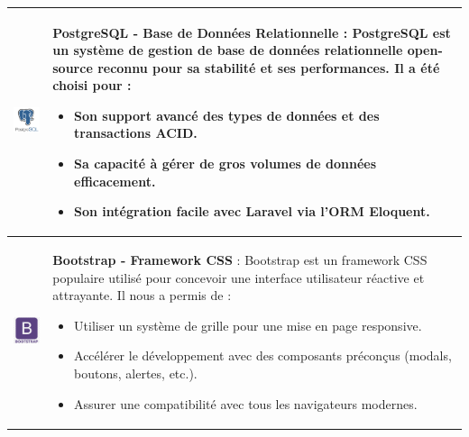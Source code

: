 \begin{longtable}{|m{4cm}|m{10cm}|}
    \includegraphics[width=3cm]{images/logo/postgresql.png} & 
    \textbf{PostgreSQL - Base de Données Relationnelle} : PostgreSQL est un système de gestion de base de données relationnelle open-source reconnu pour sa stabilité et ses performances. Il a été choisi pour :  
    \begin{itemize}
        \item Son support avancé des types de données et des transactions ACID.
        \item Sa capacité à gérer de gros volumes de données efficacement.
        \item Son intégration facile avec Laravel via l'ORM Eloquent.
    \end{itemize}\\
    \hline

    \includegraphics[width=3cm]{images/logo/bootstrap.png} & 
    \textbf{Bootstrap - Framework CSS} : Bootstrap est un framework CSS populaire utilisé pour concevoir une interface utilisateur réactive et attrayante. Il nous a permis de :  
    \begin{itemize}
        \item Utiliser un système de grille pour une mise en page responsive.
        \item Accélérer le développement avec des composants préconçus (modals, boutons, alertes, etc.).
        \item Assurer une compatibilité avec tous les navigateurs modernes.
    \end{itemize}\\
    \hline


\end{longtable}

